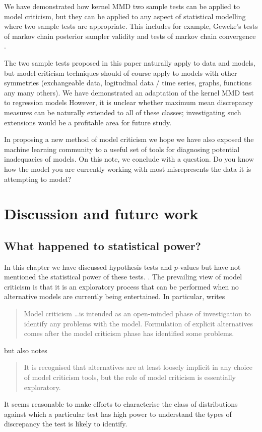 We have demonstrated how kernel MMD two sample tests can be applied to model criticism, but they can be applied to any aspect of statistical modelling where two sample tests are appropriate.
This includes for example, Geweke's tests of markov chain posterior sampler validity \citep{Geweke2004-yx} and tests of markov chain convergence \citep[e.g.][]{Cowles1996-qy}.

The two sample tests proposed in this paper naturally apply to \iid data and models, but model criticism techniques should of course apply to models with other symmetries (\eg exchangeable data, logitudinal data / time series, graphs, functions any many others).
We have demonstrated an adaptation of the kernel MMD test to regression models
However, it is unclear whether maximum mean discrepancy measures can be naturally extended to all of these classes; investigating such extensions would be a profitable area for future study.

In proposing a new method of model criticism we hope we have also exposed the machine learning community to a useful set of tools for diagnosing potential inadequacies of models.
On this note, we conclude with a question.
Do you know how the model you are currently working with most misrepresents the data it is attempting to model?

\section{Discussion and future work}

\subsection{What happened to statistical power?}

In this chapter we have discussed hypothesis tests and $p$-values but have not mentioned the statistical power of these tests.
.
The prevailing view of model criticism is that it is an exploratory process that can be performed when no alternative models are currently being entertained.
In particular, \citet{OHagan2003-bc} writes
\begin{quotation}
Model criticism \dots is intended as an open-minded phase of investigation
to identify any problems with the model. Formulation of explicit alternatives
comes after the model criticism phase has identified some problems.
\end{quotation}
but also notes
\begin{quotation}
It is recognised that alternatives are at least loosely implicit
in any choice of model criticism tools, but the role of model criticism is
essentially exploratory.
\end{quotation}
It seems reasonable to make efforts to characterise the class of distributions against which a particular test has high power to understand the types of discrepancy the test is likely to identify.

